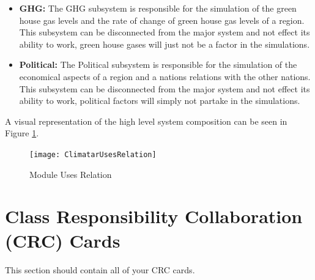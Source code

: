 \documentclass[]{article}
\begin{document}
\begin{itemize}
	\item \textbf{GHG:} The GHG subsystem is responsible for the simulation of the green house gas levels and the rate of change of green house gas levels of a region. This subsystem can be disconnected from the major system and not effect its ability to work, green house gases will just not be a factor in the simulations.

	\item \textbf{Political:} The Political subsystem is responsible for the simulation of the economical aspects of a region and a nations relations with the other nations. This subsystem can be disconnected from the major system and not effect its ability to work, political factors will simply not partake in the simulations.

\end{itemize}
A visual representation of the high level system composition can be seen in Figure \ref{usesrelation}.
\begin{figure}[ht!]
\centering
\texttt{[image: ClimatarUsesRelation]}
\caption{Module Uses Relation \label{usesrelation}}
\end{figure}


\section{Class Responsibility Collaboration (CRC) Cards}
\label{sec:class_responsibility_collaboration_crc_cards}
This section should contain all of your CRC cards.
\end{document}
